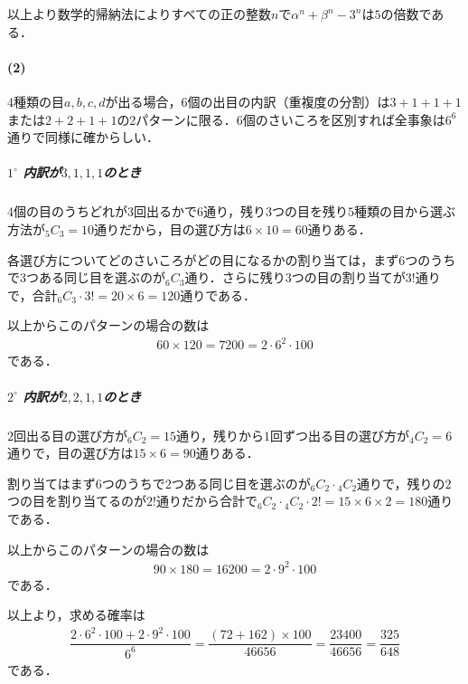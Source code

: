 \documentclass[../../main.tex]{subfiles}
\begin{document}
以上より数学的帰納法によりすべての正の整数$n$で$\alpha^n+\beta^n-3^n$は$5$の倍数である．

\paragraph{(2)}

4種類の目$a,b,c,d$が出る場合，6個の出目の内訳（重複度の分割）は$3+1+1+1$または$2+2+1+1$の2パターンに限る．6個のさいころを区別すれば全事象は$6^6$通りで同様に確からしい．

\subparagraph{$1^\circ$ 内訳が$3,1,1,1$のとき}

$4$個の目のうちどれが$3$回出るかで$6$通り，残り$3$つの目を残り$5$種類の目から選ぶ方法が${}_5C_3=10$通りだから，目の選び方は$6\times10=60$通りある．

各選び方についてどのさいころがどの目になるかの割り当ては，まず$6$つのうちで$3$つある同じ目を選ぶのが${}_6C_{3}$通り．さらに残り$3$つの目の割り当てが$3!$通りで，合計${}_6C_3\cdot3!=20\times6=120$通りである．

以上からこのパターンの場合の数は
\begin{align}
  60\times120=7200=2\cdot6^2\cdot100
\end{align}
である．

\subparagraph{$2^\circ$ 内訳が$2,2,1,1$のとき}

$2$回出る目の選び方が${}_6C_2=15$通り，残りから$1$回ずつ出る目の選び方が${}_4C_2=6$通りで，目の選び方は$15\times6=90$通りある．

割り当てはまず$6$つのうちで$2$つある同じ目を選ぶのが${}_6C_2\cdot{}_4C_2$通りで，残りの$2$つの目を割り当てるのが$2!$通りだから合計で${}_6C_2\cdot{}_4C_2\cdot2!=15\times6\times2=180$通りである．

以上からこのパターンの場合の数は
\begin{align}
  90\times180=16200=2\cdot9^2\cdot100
\end{align}
である．
\casesend

以上より，求める確率は
\begin{align}
  \dfrac{2\cdot6^2\cdot100+2\cdot9^2\cdot100}{6^6}=\dfrac{(72+162)\times100}{46656}=\dfrac{23400}{46656}=\dfrac{325}{648}
\end{align}
である．

\newpage
\end{document}
